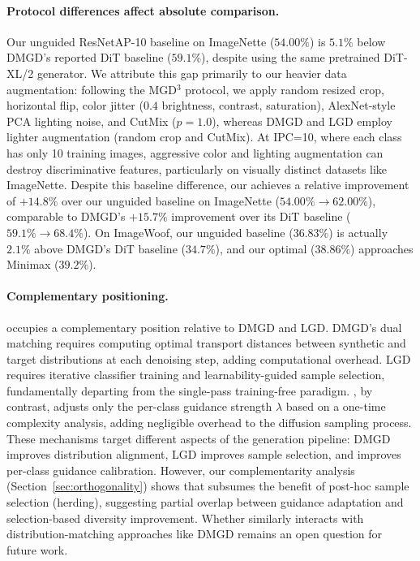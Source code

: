 \paragraph{Protocol differences affect absolute comparison.}
Our unguided ResNetAP-10 baseline on ImageNette ($54.00\%$) is $5.1\%$ below DMGD's reported DiT baseline ($59.1\%$), despite using the same pretrained DiT-XL/2 generator. We attribute this gap primarily to our heavier data augmentation: following the MGD$^3$ protocol, we apply random resized crop, horizontal flip, color jitter ($0.4$ brightness, contrast, saturation), AlexNet-style PCA lighting noise, and CutMix ($p{=}1.0$), whereas DMGD and LGD employ lighter augmentation (random crop and CutMix). At IPC=10, where each class has only 10 training images, aggressive color and lighting augmentation can destroy discriminative features, particularly on visually distinct datasets like ImageNette. Despite this baseline difference, our \cags{} achieves a relative improvement of $+14.8\%$ over our unguided baseline on ImageNette ($54.00\% \to 62.00\%$), comparable to DMGD's $+15.7\%$ improvement over its DiT baseline ($59.1\% \to 68.4\%$). On ImageWoof, our unguided baseline ($36.83\%$) is actually $2.1\%$ above DMGD's DiT baseline ($34.7\%$), and our \cags{} optimal ($38.86\%$) approaches Minimax ($39.2\%$).

\paragraph{Complementary positioning.}
\cags{} occupies a complementary position relative to DMGD and LGD. DMGD's dual matching requires computing optimal transport distances between synthetic and target distributions at each denoising step, adding computational overhead. LGD requires iterative classifier training and learnability-guided sample selection, fundamentally departing from the single-pass training-free paradigm. \cags{}, by contrast, adjusts only the per-class guidance strength $\lambda$ based on a one-time complexity analysis, adding negligible overhead to the diffusion sampling process. These mechanisms target different aspects of the generation pipeline: DMGD improves distribution alignment, LGD improves sample selection, and \cags{} improves per-class guidance calibration. However, our complementarity analysis (Section~\ref{sec:orthogonality}) shows that \cags{} subsumes the benefit of post-hoc sample selection (herding), suggesting partial overlap between guidance adaptation and selection-based diversity improvement. Whether \cags{} similarly interacts with distribution-matching approaches like DMGD remains an open question for future work.
